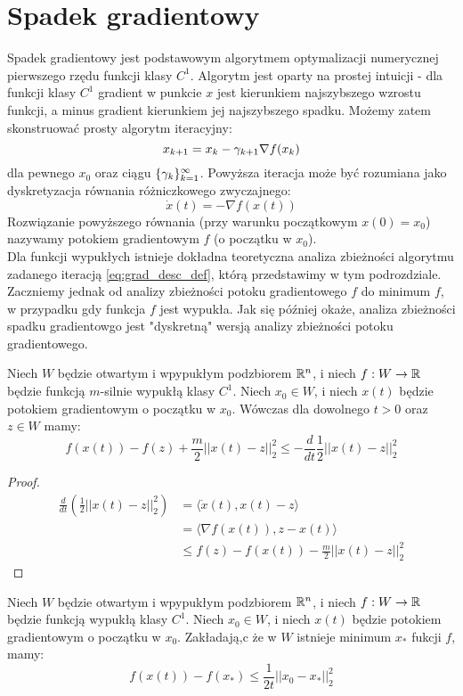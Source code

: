 \documentclass[10pt,a4paper,draft]{report}
\begin{document}
\section{Spadek gradientowy}
Spadek gradientowy jest podstawowym algorytmem optymalizacji numerycznej pierwszego rzędu funkcji klasy $C^1$.
Algorytm jest oparty na prostej intuicji - dla funkcji klasy $C^1$ gradient w punkcie $x$ jest kierunkiem najszybszego wzrostu funkcji, a minus gradient kierunkiem jej najszybszego spadku. Możemy zatem skonstruować prosty algorytm iteracyjny:
\begin{equation} \label{eq:grad_desc_def}
x_{k+1} = x_k - \gamma_{k+1} \nabla f(x_k)
\end{equation}
dla pewnego $x_0$ oraz ciągu $\{\gamma_{k} \}_{k=1}^{\infty}$.
Powyższa iteracja może być rozumiana jako dyskretyzacja równania różniczkowego zwyczajnego:
\[
\dot{x}(t) = - \nabla f(x(t))
\]
Rozwiązanie powyższego równania (przy warunku początkowym $x(0) = x_0$) nazywamy potokiem gradientowym $f$ (o początku w $x_0$).
\\
Dla funkcji wypukłych istnieje dokładna teoretyczna analiza zbieżności algorytmu zadanego iteracją \ref{eq:grad_desc_def}, którą przedstawimy w tym podrozdziale. Zaczniemy jednak od analizy zbieżności potoku gradientowego $f$ do minimum $f$, w przypadku gdy funkcja $f$ jest wypukła. Jak się później okaże, analiza zbieżności spadku gradientowgo jest "dyskretną" wersją analizy zbieżności potoku gradientowego.
\begin{lemma}
Niech $W$ będzie otwartym i wpypukłym podzbiorem $\mathbb{R}^n$, i niech $f : W \rightarrow \mathbb{R}$ będzie funkcją $m$-silnie wypukłą klasy $C^1$. Niech $x_0 \in W$, i niech $x(t)$ będzie potokiem gradientowym o początku w $x_0$. Wówczas dla dowolnego $t > 0$ oraz $z \in W$ mamy:
\[
f(x(t)) - f(z) + \frac{m}{2}||x(t) - z||_2^2 \leq - \frac{d}{dt} \frac{1}{2} ||x(t) - z||_2^2
\] 
\end{lemma}
\begin{proof}
\[
\begin{aligned}
\frac{d}{dt} \left( \frac{1}{2}||x(t) - z||_2^2 \right) & = \langle \dot{x}(t), x(t) - z \rangle \\
& = \langle \nabla f(x(t)), z - x(t) \rangle \\
& \leq f(z) - f(x(t)) - \frac{m}{2}||x(t) - z||_2^2
\end{aligned}
\]
\end{proof}
\begin{lemma}
Niech $W$ będzie otwartym i wpypukłym podzbiorem $\mathbb{R}^n$, i niech $f : W \rightarrow \mathbb{R}$ będzie funkcją wypukłą klasy $C^1$. Niech $x_0 \in W$, i niech $x(t)$ będzie potokiem gradientowym o początku w $x_0$. Zakładają,c że w $W$ istnieje minimum $x_*$ fukcji $f$, mamy:
\[
f(x(t)) - f(x_*) \leq \frac{1}{2t}||x_0 - x_*||_2^2
\]
\end{lemma}
\end{document}
